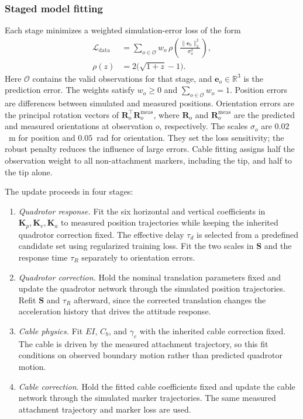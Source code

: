 \documentclass[letterpaper, 10 pt, conference]{ieeeconf}
\begin{document}
\subsubsection{Staged model fitting}
Each stage minimizes a weighted simulation-error loss of the form
\begin{equation}
\begin{aligned}
\mathcal L_{\mathrm{data}}
&=\sum_{o\in\mathcal O}w_o\,
\rho\!\left(\frac{\|\mathbf e_o\|_2^2}{\sigma_o^2}\right),\\
\rho(z)&=2\bigl(\sqrt{1+z}-1\bigr).
\end{aligned}
\label{eq:refinement_data_loss}
\end{equation}
Here $\mathcal O$ contains the valid observations for that stage,
and $\mathbf e_o\in\mathbb{R}^3$ is the prediction error.
The weights satisfy $w_o\geq0$ and $\sum_{o\in\mathcal O}w_o=1$.
Position errors are differences between simulated and measured
positions. Orientation errors are the principal rotation vectors
of $\mathbf{R}_o^\top \mathbf{R}_o^{\mathrm{meas}}$, where $\mathbf{R}_o$ and
$\mathbf{R}_o^{\mathrm{meas}}$ are the predicted and measured orientations
at observation $o$, respectively.
The scales $\sigma_o$ are $0.02$~m for position and $0.05$~rad
for orientation. They set the loss sensitivity; the robust penalty
reduces the influence of large errors. Cable fitting assigns half
the observation weight to all non-attachment markers, including
the tip, and half to the tip alone.

The update proceeds in four stages:
\begin{enumerate}
    \item \emph{Quadrotor response.}
    Fit the six horizontal and vertical coefficients in
    $\mathbf{K}_p,\mathbf{K}_v,\mathbf{K}_a$ to measured position trajectories while keeping
    the inherited quadrotor correction fixed. The effective delay
    $\tau_d$ is selected from a predefined candidate set using
    regularized training loss. Fit the two scales in $\mathbf{S}$ and
    the response time $\tau_R$ separately to orientation errors.

    \item \emph{Quadrotor correction.}
    Hold the nominal translation parameters fixed and update the
    quadrotor network through the simulated position trajectories.
    Refit $\mathbf{S}$ and $\tau_R$ afterward, since the corrected
    translation changes the acceleration history that drives
    the attitude response.

    \item \emph{Cable physics.}
    Fit $EI$, $C_b$, and $\gamma_c$ with the inherited cable
    correction fixed. The cable is driven by the measured
    attachment trajectory, so this fit conditions on observed
    boundary motion rather than predicted quadrotor motion.

    \item \emph{Cable correction.}
    Hold the fitted cable coefficients fixed and update the cable
    network through the simulated marker trajectories. The same
    measured attachment trajectory and marker loss are used.
\end{enumerate}
\end{document}
